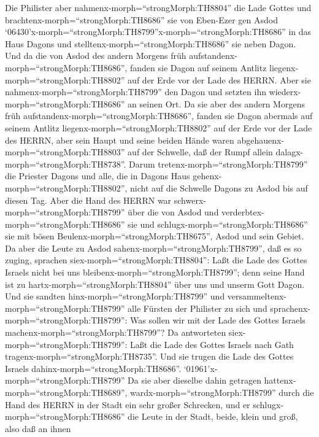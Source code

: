  Die Philister aber nahmenx-morph=``strongMorph:TH8804'' die
Lade Gottes und brachtenx-morph=``strongMorph:TH8686'' sie von Eben-Ezer
gen Asdod 
`06430'x-morph=``strongMorph:TH8799''x-morph=``strongMorph:TH8686'' in
das Haus Dagons und stelltenx-morph=``strongMorph:TH8686'' sie neben
Dagon.  Und da die von Asdod des andern Morgens früh
aufstandenx-morph=``strongMorph:TH8686'', fanden sie Dagon auf seinem
Antlitz liegenx-morph=``strongMorph:TH8802'' auf der Erde vor der Lade
des HERRN. Aber sie nahmenx-morph=``strongMorph:TH8799'' den Dagon und
setzten ihn wiederx-morph=``strongMorph:TH8686'' an seinen Ort.
 Da sie aber des andern Morgens früh
aufstandenx-morph=``strongMorph:TH8686'', fanden sie Dagon abermals auf
seinem Antlitz liegenx-morph=``strongMorph:TH8802'' auf der Erde vor der
Lade des HERRN, aber sein Haupt und seine beiden Hände waren
abgehauenx-morph=``strongMorph:TH8803'' auf der Schwelle, daß der Rumpf
allein dalagx-morph=``strongMorph:TH8738''.  Darum
tretenx-morph=``strongMorph:TH8799'' die Priester Dagons und alle, die
in Dagons Haus gehenx-morph=``strongMorph:TH8802'', nicht auf die
Schwelle Dagons zu Asdod bis auf diesen Tag.  Aber die Hand
des HERRN war schwerx-morph=``strongMorph:TH8799'' über die von Asdod
und verderbtex-morph=``strongMorph:TH8686'' sie und
schlugx-morph=``strongMorph:TH8686'' sie mit bösen
Beulenx-morph=``strongMorph:TH8675'', Asdod und sein Gebiet.
 Da aber die Leute zu Asdod
sahenx-morph=``strongMorph:TH8799'', daß es so zuging, sprachen
siex-morph=``strongMorph:TH8804'': Laßt die Lade des Gottes Israels
nicht bei uns bleibenx-morph=``strongMorph:TH8799''; denn seine Hand ist
zu hartx-morph=``strongMorph:TH8804'' über uns und unserm Gott Dagon.
 Und sie sandten hinx-morph=``strongMorph:TH8799'' und
versammeltenx-morph=``strongMorph:TH8799'' alle Fürsten der Philister zu
sich und sprachenx-morph=``strongMorph:TH8799'': Was sollen wir mit der
Lade des Gottes Israels machenx-morph=``strongMorph:TH8799''? Da
antworteten siex-morph=``strongMorph:TH8799'': Laßt die Lade des Gottes
Israels nach Gath tragenx-morph=``strongMorph:TH8735''. Und sie trugen
die Lade des Gottes Israels dahinx-morph=``strongMorph:TH8686''.
 `01961'\textbar x-morph=``strongMorph:TH8799'' Da sie aber
dieselbe dahin getragen hattenx-morph=``strongMorph:TH8689'',
wardx-morph=``strongMorph:TH8799'' durch die Hand des HERRN in der Stadt
ein sehr großer Schrecken, und er schlugx-morph=``strongMorph:TH8686''
die Leute in der Stadt, beide, klein und groß, also daß an ihnen
